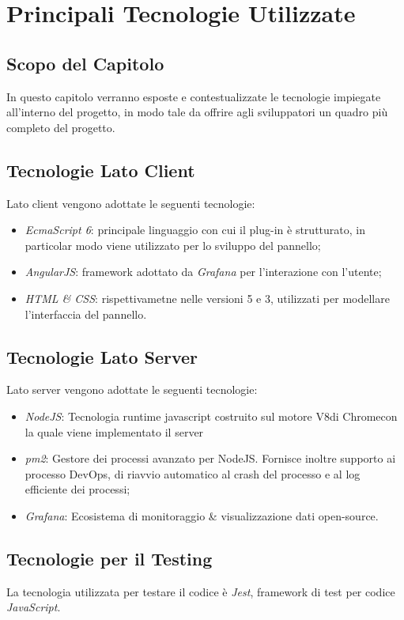 \section{Principali Tecnologie Utilizzate}\label{tecnologie}
\subsection{Scopo del Capitolo}
In questo capitolo verranno esposte e contestualizzate le tecnologie impiegate all'interno del progetto, in modo tale da offrire agli sviluppatori un quadro più completo del progetto.

\subsection{Tecnologie Lato Client}\label{clientTec}
Lato client vengono adottate le seguenti tecnologie:
\begin{itemize}
	\item \textit{EcmaScript 6}: principale linguaggio con cui il plug-in è strutturato, in particolar modo viene utilizzato per lo sviluppo del pannello;
	\item \textit{AngularJS}: framework adottato da \textit{Grafana} per l'interazione con l'utente;
	\item \textit{HTML \& CSS}: rispettivametne nelle versioni 5 e 3, utilizzati per modellare l'interfaccia del pannello.
\end{itemize}

\subsection{Tecnologie Lato Server}\label{serverTec}
Lato server vengono adottate le seguenti tecnologie:
\begin{itemize}
	\item \textit{NodeJS}: Tecnologia runtime javascript costruito sul motore V8\glossario di Chrome\glossario con la quale viene implementato il server 
	\item \textit{pm2}: Gestore dei processi avanzato per NodeJS. Fornisce inoltre supporto ai processo DevOps\glossario , di riavvio automatico al crash del processo e al log efficiente dei processi;
	\item \textit{Grafana}: Ecosistema di monitoraggio \& visualizzazione dati open-source.
\end{itemize}

\subsection{Tecnologie per il Testing}\label{testTec}
La tecnologia utilizzata per testare il codice è \textit{Jest}, framework di test per codice \textit{JavaScript}.